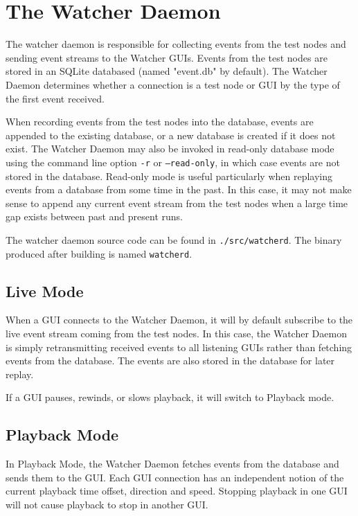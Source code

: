 \newpage
\label{watcherd}
\section{The Watcher Daemon}

The watcher daemon is responsible for collecting events from the test nodes and
sending event streams to the Watcher GUIs.  Events from the test nodes are
stored in an SQLite databased (named "event.db" by default).  The Watcher Daemon
determines whether a connection is a test node or GUI by the type of the first
event received.

When recording events from the test nodes into the database, events are
appended to the existing database, or a new database is created if it does not
exist.  The Watcher Daemon may also be invoked in read-only database mode using
the command line option {\tt -r} or {\tt --read-only}, in which case events are not stored
in the database.  Read-only mode is useful particularly when replaying events
from a database from some time in the past.  In this case, it may not make
sense to append any current event stream from the test nodes when a large time
gap exists between past and present runs.

The watcher daemon source code can be found in {\tt .\slash src\slash watcherd}. The binary produced after building is 
named {\tt watcherd}. 

\subsection{Live Mode}

When a GUI connects to the Watcher Daemon, it will by default subscribe to the
live event stream coming from the test nodes.  In this case, the Watcher Daemon
is simply retransmitting received events to all listening GUIs rather than
fetching events from the database.  The events are also stored in the database
for later replay.

If a GUI pauses, rewinds, or slows playback, it will switch to Playback mode.

\subsection{Playback Mode}

In Playback Mode, the Watcher Daemon fetches events from the database and sends
them to the GUI.  Each GUI connection has an independent notion of the current
playback time offset, direction and speed.  Stopping playback in one GUI will
not cause playback to stop in another GUI.

